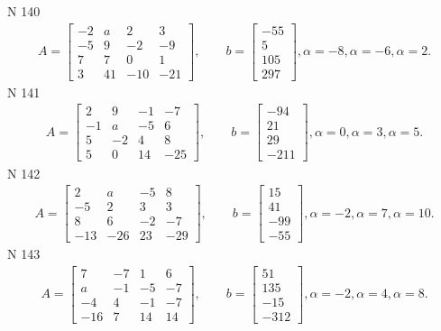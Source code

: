 \documentclass[11pt]{report}
\begin{document}
N 140
\begin{align*}
 A = \left[\begin{matrix}-2 & a & 2 & 3\\-5 & 9 & -2 & -9\\7 & 7 & 0 & 1\\3 & 41 & -10 & -21\end{matrix}\right],
    \qquad b = \left[\begin{matrix}-55\\5\\105\\297\end{matrix}\right], \alpha = -8, \alpha = -6, \alpha = 2. 
 \end{align*}
N 141
\begin{align*}
 A = \left[\begin{matrix}2 & 9 & -1 & -7\\-1 & a & -5 & 6\\5 & -2 & 4 & 8\\5 & 0 & 14 & -25\end{matrix}\right],
    \qquad b = \left[\begin{matrix}-94\\21\\29\\-211\end{matrix}\right], \alpha = 0, \alpha = 3, \alpha = 5. 
 \end{align*}
N 142
\begin{align*}
 A = \left[\begin{matrix}2 & a & -5 & 8\\-5 & 2 & 3 & 3\\8 & 6 & -2 & -7\\-13 & -26 & 23 & -29\end{matrix}\right],
    \qquad b = \left[\begin{matrix}15\\41\\-99\\-55\end{matrix}\right], \alpha = -2, \alpha = 7, \alpha = 10. 
 \end{align*}
N 143
\begin{align*}
 A = \left[\begin{matrix}7 & -7 & 1 & 6\\a & -1 & -5 & -7\\-4 & 4 & -1 & -7\\-16 & 7 & 14 & 14\end{matrix}\right],
    \qquad b = \left[\begin{matrix}51\\135\\-15\\-312\end{matrix}\right], \alpha = -2, \alpha = 4, \alpha = 8. 
 \end{align*}
\end{document}
